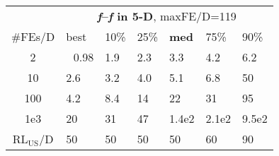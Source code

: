 \begin{tabular}{c|llllll}
 & \multicolumn{6}{|c}{\textbf{\textit{f}\raisebox{-0.35ex}{1}--\textit{f}\raisebox{-0.35ex}{24} in 5-D}, maxFE/D=119}\\
\#FEs/D & best & 10\% & 25\% & \textbf{med} & 75\% & 90\%\\
2 & ~\,0.98 & \hspace*{1ex}1.9 & \hspace*{1ex}2.3 & \hspace*{1ex}3.3 & \hspace*{1ex}4.2 & \hspace*{1ex}6.2\\
10 & \hspace*{1ex}2.6 & \hspace*{1ex}3.2 & \hspace*{1ex}4.0 & \hspace*{1ex}5.1 & \hspace*{1ex}6.8 & 50\\
100 & \hspace*{1ex}4.2 & \hspace*{1ex}8.4 & 14 & 22 & 31 & 95\\
1e3 & 20 & 31 & 47 & 1.4e2 & 2.1e2 & 9.5e2\\
$\text{RL}_{\text{US}}$/D & 50 & 50 & 50 & 50 & 60 & 90
\end{tabular}
